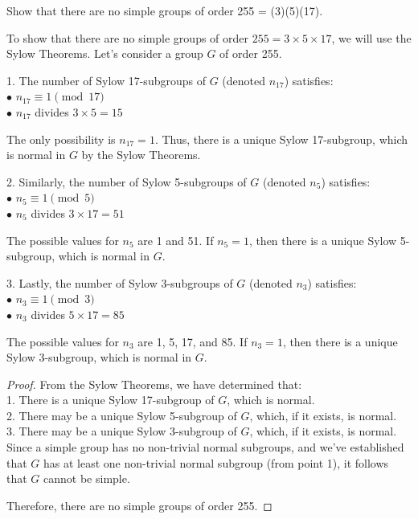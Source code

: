 \documentclass[12pt]{amsart}
\theoremstyle{definition}
\numberwithin{equation}{section}
\theoremstyle{plain}
\begin{document}
\vspace*{20pt}
\begin{exercise}{18} Show that there are no simple groups of order 255 = (3)(5)(17).

To show that there are no simple groups of order \( 255 = 3 \times 5 \times 17 \), we will use the Sylow Theorems. Let's consider a group \( G \) of order 255. 

1. The number of Sylow 17-subgroups of \( G \) (denoted \( n_{17} \)) satisfies:\\
   $\bullet$ \( n_{17} \equiv 1 \pmod{17} \) \\
   $\bullet$ \( n_{17} \) divides \( 3 \times 5 = 15 \)

The only possibility is \( n_{17} = 1 \). Thus, there is a unique Sylow 17-subgroup, which is normal in \( G \) by the Sylow Theorems.

2. Similarly, the number of Sylow 5-subgroups of \( G \) (denoted \( n_{5} \)) satisfies:\\
   $\bullet$ \( n_{5} \equiv 1 \pmod{5} \)\\
   $\bullet$ \( n_{5} \) divides \( 3 \times 17 = 51 \)

The possible values for \( n_{5} \) are 1 and 51. If \( n_{5} = 1 \), then there is a unique Sylow 5-subgroup, which is normal in \( G \).

3. Lastly, the number of Sylow 3-subgroups of \( G \) (denoted \( n_{3} \)) satisfies:\\
   $\bullet$ \( n_{3} \equiv 1 \pmod{3} \)\\
   $\bullet$ \( n_{3} \) divides \( 5 \times 17 = 85 \)

The possible values for \( n_{3} \) are 1, 5, 17, and 85. If \( n_{3} = 1 \), then there is a unique Sylow 3-subgroup, which is normal in \( G \).

\begin{proof}
From the Sylow Theorems, we have determined that:\\
1. There is a unique Sylow 17-subgroup of \( G \), which is normal.\\
2. There may be a unique Sylow 5-subgroup of \( G \), which, if it exists, is normal.\\
3. There may be a unique Sylow 3-subgroup of \( G \), which, if it exists, is normal.\\

Since a simple group has no non-trivial normal subgroups, and we've established that \( G \) has at least one non-trivial normal subgroup (from point 1), it follows that \( G \) cannot be simple.

Therefore, there are no simple groups of order 255.
\end{proof}

\end{exercise}
\vspace*{20pt}
\end{document}
